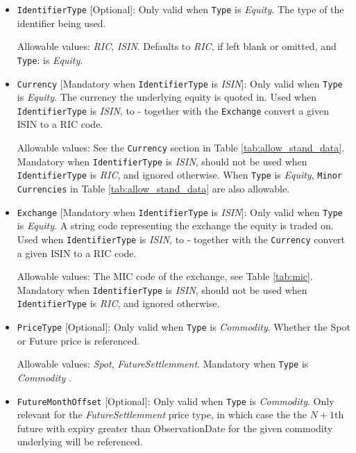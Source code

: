 \begin{itemize}
\item \lstinline!IdentifierType! [Optional]:
Only valid when \lstinline!Type! is  \emph{Equity}. The type of the identifier being used.  

Allowable values:  \emph{RIC}, \emph{ISIN}. Defaults to \emph{RIC}, if left blank or omitted, and \lstinline!Type!: is  \emph{Equity}.

\item \lstinline!Currency! [Mandatory when \lstinline!IdentifierType! is  \emph{ISIN}]: Only valid when \lstinline!Type! is  \emph{Equity}. The currency the underlying equity is quoted in. Used when \lstinline!IdentifierType! is  \emph{ISIN}, to - together with the \lstinline!Exchange!  convert a given ISIN to a RIC code.  

Allowable values: See the \lstinline!Currency! section in Table \ref{tab:allow_stand_data}. Mandatory when \lstinline!IdentifierType! is  \emph{ISIN}, should not be used when  \lstinline!IdentifierType! is  \emph{RIC}, and ignored otherwise. When \lstinline!Type! is \emph{Equity}, \lstinline!Minor Currencies! in Table \ref{tab:allow_stand_data} are also allowable.

\item \lstinline!Exchange! [Mandatory when \lstinline!IdentifierType! is  \emph{ISIN}]:
Only valid when \lstinline!Type! is  \emph{Equity}. A string code representing the exchange the equity is traded on. Used when \lstinline!IdentifierType! is  \emph{ISIN}, to - together with the \lstinline!Currency!  convert a given ISIN to a RIC code.  

Allowable values:  The MIC code of the exchange, see Table \ref{tab:mic}. Mandatory when \lstinline!IdentifierType! is  \emph{ISIN}, should not be used when  \lstinline!IdentifierType! is \emph{RIC}, and ignored otherwise.

\item \lstinline!PriceType! [Optional]:
Only valid when  \lstinline!Type! is  \emph{Commodity}.  Whether the Spot or Future price is referenced. 

Allowable values:  \emph{Spot}, \emph{FutureSettlemment}. Mandatory when  \lstinline!Type! is  \emph{Commodity} .

\item \lstinline!FutureMonthOffset! [Optional]:
Only valid when  \lstinline!Type! is  \emph{Commodity}. Only relevant for the \emph{FutureSettlemment} price type, in which case the the $N+1$th future with
  expiry greater than ObservationDate for the given commodity underlying will be referenced.


\end{itemize}
